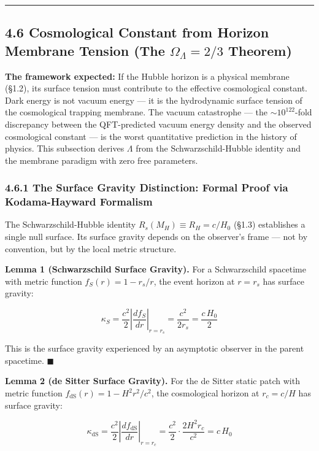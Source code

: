 \documentclass[11pt,a4paper]{article}
\theoremstyle{definition}\newtheorem{definition}{Definition}
\theoremstyle{remark}\newtheorem{remark}{Remark}
\begin{document}
\noindent\rule{\linewidth}{0.4pt}
\subsection{4.6 Cosmological Constant from Horizon Membrane Tension (The $\Omega_\Lambda = 2/3$ Theorem)}


\textbf{The framework expected:} If the Hubble horizon is a physical membrane (§1.2), its surface tension must contribute to the effective cosmological constant. Dark energy is not vacuum energy — it is the hydrodynamic surface tension of the cosmological trapping membrane. The vacuum catastrophe — the $\sim 10^{122}$-fold discrepancy between the QFT-predicted vacuum energy density and the observed cosmological constant — is the worst quantitative prediction in the history of physics. This subsection derives $\Lambda$ from the Schwarzschild-Hubble identity and the membrane paradigm with zero free parameters.
\subsubsection{4.6.1 The Surface Gravity Distinction: Formal Proof via Kodama-Hayward Formalism}

The Schwarzschild-Hubble identity $R_s(M_H) \equiv R_H = c/H_0$ (§1.3) establishes a single null surface. Its surface gravity depends on the observer's frame — not by convention, but by the local metric structure.

\textbf{Lemma 1 (Schwarzschild Surface Gravity).} For a Schwarzschild spacetime with metric function $f_S(r) = 1 - r_s/r$, the event horizon at $r = r_s$ has surface gravity:


\begin{equation}
\kappa_S = \frac{c^2}{2} \left|\frac{df_S}{dr}\right|_{r=r_s} = \frac{c^2}{2 r_s} = \frac{c \, H_0}{2}
\end{equation}


This is the surface gravity experienced by an asymptotic observer in the parent spacetime. $\blacksquare$

\textbf{Lemma 2 (de Sitter Surface Gravity).} For the de Sitter static patch with metric function $f_{\text{dS}}(r) = 1 - H^2 r^2/c^2$, the cosmological horizon at $r_c = c/H$ has surface gravity:


\begin{equation}
\kappa_{\text{dS}} = \frac{c^2}{2} \left|\frac{df_{\text{dS}}}{dr}\right|_{r=r_c} = \frac{c^2}{2} \cdot \frac{2 H^2 r_c}{c^2} = c \, H_0
\end{equation}
\end{document}
